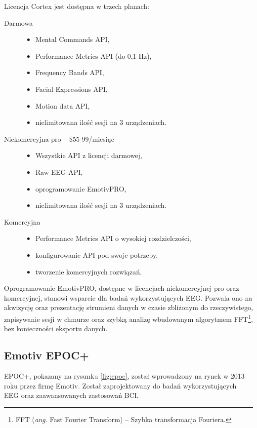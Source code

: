 \documentclass[skorowidz,skroty]{dyplomWEZUT}
\begin{document}
Licencja Cortex jest dostępna w trzech planach:
\begin{description}
    \item [Darmowa] \hfill
    \begin{itemize}
        \item Mental Commands API,
        \item Performance Metrics API (do 0,1 Hz),
        \item Frequency Bands API,
        \item Facial Expressions API,
        \item Motion data API,
        \item nielimitowana ilość sesji na 3 urządzeniach.
    \end{itemize}
    \item [Niekomercyjna pro -- \$55-99/miesiąc] \hfill
    \begin{itemize}
        \item Wszystkie API z licencji darmowej,
        \item Raw EEG API,
        \item oprogramowanie EmotivPRO,
        \item nielimitowana ilość sesji na 3 urządzeniach.
    \end{itemize}
    \item [Komercyjna] \hfill
    \begin{itemize}
        \item Performance Metrics API o wysokiej rozdzielczości,
        \item konfigurowanie API pod swoje potrzeby,
        \item tworzenie komercyjnych rozwiązań.
    \end{itemize}
\end{description}

Oprogramowanie EmotivPRO\cite{emotiv_pro}, dostępne w licencjach niekomercyjnej pro oraz komercyjnej, stanowi wsparcie dla badań wykorzystujących EEG. Pozwala ono na akwizycję oraz prezentację strumieni danych w czasie zbliżonym do rzeczywistego, zapisywanie sesji w chmurze oraz szybką analizę wbudowanym algorytmem FFT\footnote{FFT (\textit{ang.} Fast Fourier Transform) -- Szybka transformacja Fouriera.}, bez konieczności eksportu danych.


\subsection{Emotiv EPOC+\label{subsection:epoc}}
EPOC+, pokazany na rysunku \vref{fig:epoc}, został wprowadzony na rynek w 2013 roku przez firmę Emotiv. Został zaprojektowany do badań wykorzystujących EEG oraz zaawansowanych zastosowań BCI\cite{emotiv_epoc}.
\end{document}

